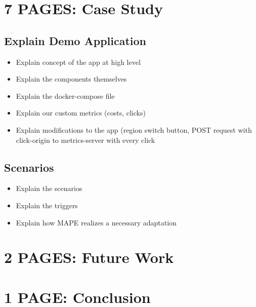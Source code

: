 \documentclass{seal_thesis}
\begin{document}
\chapter{7 PAGES: Case Study}\label{ch:casestudy}

\section{Explain Demo Application}
\begin{itemize}
	\item Explain concept of the app at high level
	\item Explain the components themselves
	\item Explain the docker-compose file
	\item Explain our custom metrics (costs, clicks)
	\item Explain modifications to the app (region switch button, POST request with click-origin to metrics-server with every click
\end{itemize}

\section{Scenarios}
\begin{itemize}
	\item Explain the scenarios
	\item Explain the triggers
	\item Explain how MAPE realizes a necessary adaptation
\end{itemize}


\chapter{2 PAGES: Future Work}\label{ch:futurework}



\chapter{1 PAGE: Conclusion}\label{ch:conclusion}





\end{document}
